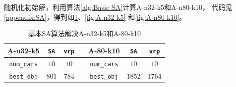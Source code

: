 \documentclass{nudt}
\begin{document}
随机化初始解，利用算法\ref{alg:Basic SA}计算A-n32-k5和A-n80-k10，
代码见\ref{appendix:SA}，得到如\cref{tab:Basic SA32and80}、\cref{fig:A-n32-k5}
和\cref{fig:A-n80-k10}。
\begin{table}[H]
	\centering
	\caption{基本SA算法解决A-n32-k5和A-80-k10}
	\label{tab:Basic SA32and80}
	\begin{tabular}{@{}ccccccc@{}}
	\toprule
	A-n32-k5           & \texttt{SA} & \texttt{vrp} &  & A-80-k10           & \texttt{SA} & \texttt{vrp} \\ \midrule
	\texttt{num\_cars} & $10$        & $10$         &  & \texttt{num\_cars} & $10$        & $10$         \\
	\texttt{best\_obj} & $801$       & $784$        &  & \texttt{best\_obj} & $1852$      & $1764$       \\ \bottomrule
	\end{tabular}
	\end{table}
\end{document}
